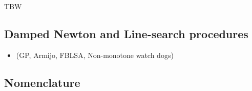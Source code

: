 \cite{Fukushima.ea2001}
\cite{Zhang.ea2009}

\cite{Hayashi.ea_SIOPT2005}




\begin{ndrva}
  TBW
\end{ndrva}



\subsection{Damped Newton and Line-search procedures}

\begin{itemize}
\item   (GP, Armijo, FBLSA, Non-monotone watch dogs)
\end{itemize}


\subsection{Nomenclature}

